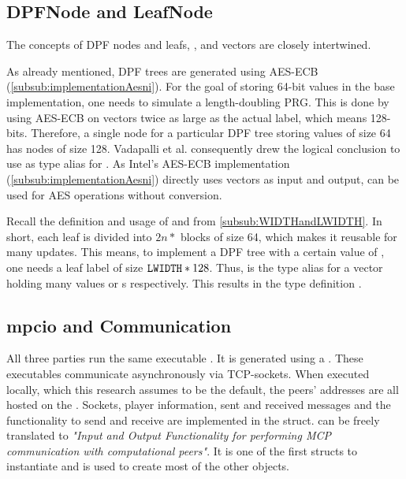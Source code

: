 \subsection*{DPFNode and LeafNode}\label{subsub:DpfNodeAndLeafLabel}
The concepts of DPF nodes and leafs, , and  vectors are closely intertwined.

As already mentioned, DPF trees are generated using AES-ECB (\ref{subsub:implementationAesni}).
For the goal of storing 64-bit values in the base implementation, one needs to simulate a length-doubling PRG.
This is done by using AES-ECB on vectors twice as large as the actual label, which means 128-bits.
Therefore, a single node for a particular DPF tree storing values of size 64 has nodes of size 128.
Vadapalli et al. consequently drew the logical conclusion to use  as type alias for .
As Intel's AES-ECB implementation (\ref{subsub:implementationAesni}) directly uses  vectors as input and output,  can be used for AES operations without conversion.

Recall the definition and usage of  and  from \ref{subsub:WIDTHandLWIDTH}.
In short, each leaf is divided into $2n*$ blocks of size 64, which makes it reusable for  many updates.
This means, to implement a DPF tree with a certain value of , one needs a leaf label of size $\code{LWIDTH}*128$.
Thus,  is the type alias for a vector holding  many  values or s respectively.
This results in the type definition . 

\subsection*{mpcio and Communication} \label{subsub:implementationMpcioAndCommunication}
All three parties run the same executable .
It is generated using a .
These executables communicate asynchronously via TCP-sockets.
When executed locally, which this research assumes to be the default, the peers' addresses are all hosted on the .
Sockets, player information, sent and received messages and the functionality to send and receive are implemented in the  struct.
 can be freely translated to \textit{"Input and Output Functionality for performing MCP communication with computational peers"}.
It is one of the first structs to instantiate and is used to create most of the other objects.

